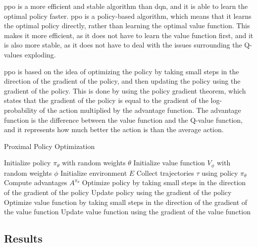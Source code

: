 \Gls{ppo} is a more efficient and stable algorithm than \gls{dqn}, and it
is able to learn the optimal policy faster. \gls{ppo} is a policy-based
algorithm, which means that it learns the optimal policy directly, rather
than learning the optimal value function. This makes it more efficient, as
it does not have to learn the value function first, and it is also more
stable, as it does not have to deal with the issues surrounding the
Q-values exploding.

\Gls{ppo} is based on the idea of optimizing the policy by taking small
steps in the direction of the gradient of the policy, and then updating
the policy using the gradient of the policy. This is done by using the
policy gradient theorem, which states that the gradient of the policy is
equal to the gradient of the log-probability of the action multiplied by
the advantage function. The advantage function is the difference between
the value function and the Q-value function, and it represents how much
better the action is than the average action.

\begin{algorithm}[H]
    \caption{Proximal Policy Optimization}
    \label{alg:ppo}
    \begin{algorithmic}
        \State Initialize policy $\pi_{\theta}$ with random weights $\theta$
        \State Initialize value function $V_{\phi}$ with random weights $\phi$
        \State Initialize environment $E$
            \State Collect trajectories $\tau$ using policy $\pi_{\theta}$
            \State Compute advantages $A^{\pi_{\theta}}$
            \State Optimize policy by taking small steps in the direction of the gradient of the policy
            \State Update policy using the gradient of the policy
            \State Optimize value function by taking small steps in the direction of the gradient of the value function
            \State Update value function using the gradient of the value function
        \EndFor
    \end{algorithmic}
\end{algorithm}

\subsection{Results}\label{subsec:agent-ppo-results}
